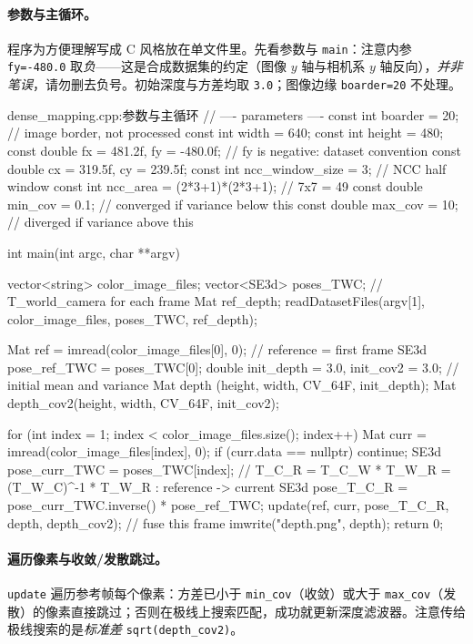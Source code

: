 \paragraph{参数与主循环。}
程序为方便理解写成 C 风格放在单文件里\cite{gaoxiang2019slam14}。先看参数与 \texttt{main}：注意内参 \texttt{fy=-480.0} 取\emph{负}——这是合成数据集的约定（图像 $y$ 轴与相机系 $y$ 轴反向），\emph{并非笔误}，请勿删去负号。初始深度与方差均取 \texttt{3.0}；图像边缘 \texttt{boarder=20} 不处理。

\begin{codebox}[C++]{dense\_mapping.cpp:参数与主循环}
// ---- parameters ----
const int    boarder = 20;        // image border, not processed
const int    width   = 640;
const int    height  = 480;
const double fx = 481.2f, fy = -480.0f;  // fy is negative: dataset convention
const double cx = 319.5f, cy = 239.5f;
const int    ncc_window_size = 3;             // NCC half window
const int    ncc_area = (2*3+1)*(2*3+1);      // 7x7 = 49
const double min_cov = 0.1;       // converged if variance below this
const double max_cov = 10;        // diverged  if variance above this

int main(int argc, char **argv) {
  vector<string> color_image_files;
  vector<SE3d>   poses_TWC;        // T_world_camera for each frame
  Mat ref_depth;
  readDatasetFiles(argv[1], color_image_files, poses_TWC, ref_depth);

  Mat ref = imread(color_image_files[0], 0);    // reference = first frame
  SE3d pose_ref_TWC = poses_TWC[0];
  double init_depth = 3.0, init_cov2 = 3.0;     // initial mean and variance
  Mat depth     (height, width, CV_64F, init_depth);
  Mat depth_cov2(height, width, CV_64F, init_cov2);

  for (int index = 1; index < color_image_files.size(); index++) {
    Mat curr = imread(color_image_files[index], 0);
    if (curr.data == nullptr) continue;
    SE3d pose_curr_TWC = poses_TWC[index];
    // T_C_R = T_C_W * T_W_R = (T_W_C)^-1 * T_W_R : reference -> current
    SE3d pose_T_C_R = pose_curr_TWC.inverse() * pose_ref_TWC;
    update(ref, curr, pose_T_C_R, depth, depth_cov2);  // fuse this frame
  }
  imwrite("depth.png", depth);
  return 0;
}
\end{codebox}

\paragraph{遍历像素与收敛/发散跳过。}
\texttt{update} 遍历参考帧每个像素：方差已小于 \texttt{min\_cov}（收敛）或大于 \texttt{max\_cov}（发散）的像素直接跳过；否则在极线上搜索匹配，成功就更新深度滤波器。注意传给极线搜索的是\emph{标准差} \texttt{sqrt(depth\_cov2)}。

